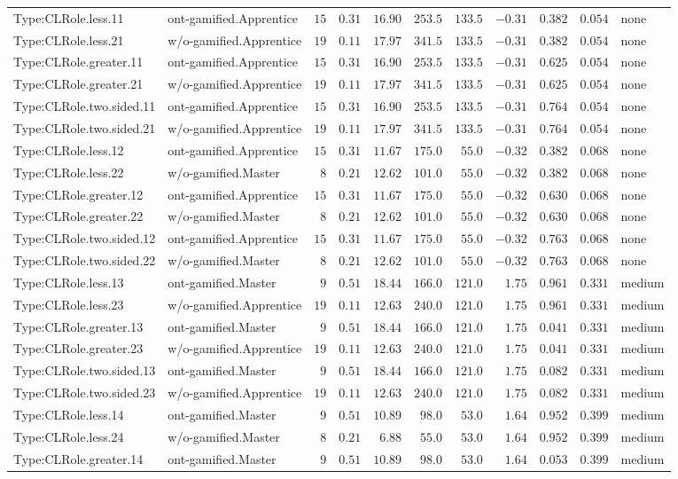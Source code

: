 \documentclass[6pt,a4paper]{article}
\begin{document}
{\begin{longtable}{llrrrrrrrrl}
Type:CLRole.less.11&ont-gamified.Apprentice&$15$&$0.31$&$16.90$&$253.5$&$133.5$&$-0.31$&$0.382$&$0.054$&none\tabularnewline
Type:CLRole.less.21&w/o-gamified.Apprentice&$19$&$0.11$&$17.97$&$341.5$&$133.5$&$-0.31$&$0.382$&$0.054$&none\tabularnewline
Type:CLRole.greater.11&ont-gamified.Apprentice&$15$&$0.31$&$16.90$&$253.5$&$133.5$&$-0.31$&$0.625$&$0.054$&none\tabularnewline
Type:CLRole.greater.21&w/o-gamified.Apprentice&$19$&$0.11$&$17.97$&$341.5$&$133.5$&$-0.31$&$0.625$&$0.054$&none\tabularnewline
Type:CLRole.two.sided.11&ont-gamified.Apprentice&$15$&$0.31$&$16.90$&$253.5$&$133.5$&$-0.31$&$0.764$&$0.054$&none\tabularnewline
Type:CLRole.two.sided.21&w/o-gamified.Apprentice&$19$&$0.11$&$17.97$&$341.5$&$133.5$&$-0.31$&$0.764$&$0.054$&none\tabularnewline
Type:CLRole.less.12&ont-gamified.Apprentice&$15$&$0.31$&$11.67$&$175.0$&$ 55.0$&$-0.32$&$0.382$&$0.068$&none\tabularnewline
Type:CLRole.less.22&w/o-gamified.Master&$ 8$&$0.21$&$12.62$&$101.0$&$ 55.0$&$-0.32$&$0.382$&$0.068$&none\tabularnewline
Type:CLRole.greater.12&ont-gamified.Apprentice&$15$&$0.31$&$11.67$&$175.0$&$ 55.0$&$-0.32$&$0.630$&$0.068$&none\tabularnewline
Type:CLRole.greater.22&w/o-gamified.Master&$ 8$&$0.21$&$12.62$&$101.0$&$ 55.0$&$-0.32$&$0.630$&$0.068$&none\tabularnewline
Type:CLRole.two.sided.12&ont-gamified.Apprentice&$15$&$0.31$&$11.67$&$175.0$&$ 55.0$&$-0.32$&$0.763$&$0.068$&none\tabularnewline
Type:CLRole.two.sided.22&w/o-gamified.Master&$ 8$&$0.21$&$12.62$&$101.0$&$ 55.0$&$-0.32$&$0.763$&$0.068$&none\tabularnewline
Type:CLRole.less.13&ont-gamified.Master&$ 9$&$0.51$&$18.44$&$166.0$&$121.0$&$ 1.75$&$0.961$&$0.331$&medium\tabularnewline
Type:CLRole.less.23&w/o-gamified.Apprentice&$19$&$0.11$&$12.63$&$240.0$&$121.0$&$ 1.75$&$0.961$&$0.331$&medium\tabularnewline
Type:CLRole.greater.13&ont-gamified.Master&$ 9$&$0.51$&$18.44$&$166.0$&$121.0$&$ 1.75$&$0.041$&$0.331$&medium\tabularnewline
Type:CLRole.greater.23&w/o-gamified.Apprentice&$19$&$0.11$&$12.63$&$240.0$&$121.0$&$ 1.75$&$0.041$&$0.331$&medium\tabularnewline
Type:CLRole.two.sided.13&ont-gamified.Master&$ 9$&$0.51$&$18.44$&$166.0$&$121.0$&$ 1.75$&$0.082$&$0.331$&medium\tabularnewline
Type:CLRole.two.sided.23&w/o-gamified.Apprentice&$19$&$0.11$&$12.63$&$240.0$&$121.0$&$ 1.75$&$0.082$&$0.331$&medium\tabularnewline
Type:CLRole.less.14&ont-gamified.Master&$ 9$&$0.51$&$10.89$&$ 98.0$&$ 53.0$&$ 1.64$&$0.952$&$0.399$&medium\tabularnewline
Type:CLRole.less.24&w/o-gamified.Master&$ 8$&$0.21$&$ 6.88$&$ 55.0$&$ 53.0$&$ 1.64$&$0.952$&$0.399$&medium\tabularnewline
Type:CLRole.greater.14&ont-gamified.Master&$ 9$&$0.51$&$10.89$&$ 98.0$&$ 53.0$&$ 1.64$&$0.053$&$0.399$&medium\tabularnewline

\end{longtable}}
\end{document}
